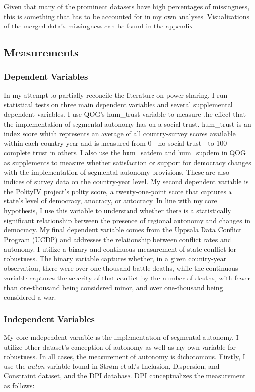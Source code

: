 \documentclass[12pt]{article}
\begin{document}
Given that many of the prominent datasets have high percentages of missingness, this is something that has to be accounted for in my own analyses. Visualizations of the merged data’s missingness can be found in the appendix. 

\subsection{Measurements}
\subsubsection{Dependent Variables} 
In my attempt to partially reconcile the literature on power-sharing, I run statistical tests on three main dependent variables and several supplemental dependent variables. I use QOG’s hum\_trust variable to measure the effect that the implementation of segmental autonomy has on a social trust. hum\_trust is an index score which represents an average of all country-survey scores available within each country-year and is measured from 0—no social trust—to 100—complete trust in others. I also use the hum\_satdem and hum\_supdem in QOG as supplements to measure whether satisfaction or support for democracy changes with the implementation of segmental autonomy provisions. These are also indices of survey data on the country-year level. My second dependent variable is the PolityIV project’s polity score, a twenty-one-point score that captures a state’s level of democracy, anocracy, or autocracy. In line with my core hypothesis, I use this variable to understand whether there is a statistically significant relationship between the presence of regional autonomy and changes in democracy. My final dependent variable comes from the Uppsala Data Conflict Program (UCDP) and addresses the relationship between conflict rates and autonomy. I utilize a binary and continuous measurement of state conflict for robustness. The binary variable captures whether, in a given country-year observation, there were over one-thousand battle deaths, while the continuous variable captures the severity of that conflict by the number of deaths, with fewer than one-thousand being considered minor, and over one-thousand being considered a war. 

\subsubsection{Independent Variables} 
My core independent variable is the implementation of segmental autonomy. I utilize other dataset’s conception of autonomy as well as my own variable for robustness. In all cases, the measurement of autonomy is dichotomous. Firstly, I use the \textit{auton} variable found in Strøm et al.’s Inclusion, Dispersion, and Constraint dataset, and the DPI database. DPI conceptualizes the measurement as follows:
\end{document}
